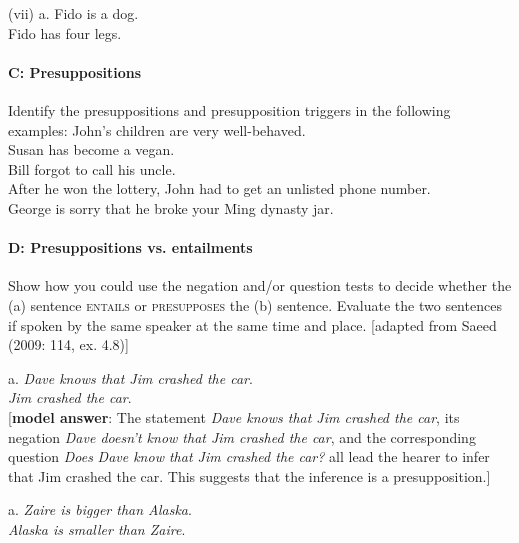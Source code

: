 \begin{stylepoints}
(vii)  a. Fido is a dog.\\
\ex Fido has four legs.
\end{stylepoints}

\paragraph{C: Presuppositions}

Identify the presuppositions and presupposition triggers in the following examples:
\ea
\ea
 John’s children are very well-behaved.\\
\ex Susan has become a vegan.\\
\ex Bill forgot to call his uncle.\\
\ex After he won the lottery, John had to get an unlisted phone number.\\
\ex George is sorry that he broke your Ming dynasty jar.
\z
\z

\paragraph{D: Presuppositions vs. entailments}

Show how you could use the negation and/or question tests to decide whether the (a) sentence \textsc{entails} or \textsc{presupposes} the (b) sentence. Evaluate the two sentences if spoken by the same speaker at the same time and place. [adapted from Saeed (2009: 114, ex. 4.8)]

\begin{stylepoints}
\ea%
    \label{ex:key:1}

          a. \textit{Dave knows that Jim crashed the car}.\\
\ex \textit{Jim crashed the car}.\\
{}[\textbf{model answer}: The statement \textit{Dave knows that Jim crashed the car}, its negation \textit{Dave doesn’t know that Jim crashed the car}, and the corresponding question \textit{Does} \textit{Dave know that Jim crashed the car?} all lead the hearer to infer that Jim crashed the car. This suggests that the inference is a presupposition.]
\z
\end{stylepoints}

\begin{stylepoints}
\ea%
    \label{ex:key:2}



          a. \textit{Zaire is bigger than Alaska}.\\
\ex \textit{Alaska is smaller than Zaire}.
\z
\end{stylepoints}

